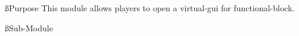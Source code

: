 \ss{Purpose}
This module allows players to open a virtual-gui for functional-block.

\ss{Sub-Module}
